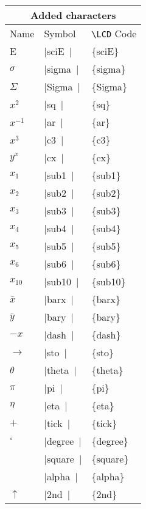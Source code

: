\documentclass[a4paper,12pt]{article}
\newcommand{\LCDsymb}[1]{\large \textLCD{1}|{#1}~|}
\newcommand{\printcmd}[1]{\texttt{\textbackslash #1}}
\begin{document}
\begin{center}
	\begin{tabular}{|l|l|>{\ttfamily}l|}
		\multicolumn{3}{c}{\textbf{Added characters}} \\
		\hline
		Name       & Symbol          &\textnormal{\printcmd{LCD} Code} \\
		\hline
		E          & \LCDsymb{sciE}  & \{sciE\} \\
		$\sigma$   & \LCDsymb{sigma} & \{sigma\} \\
        $\Sigma$   & \LCDsymb{Sigma} & \{Sigma\} \\
		$x^2$      & \LCDsymb{sq}    & \{sq\} \\
		$x^{-1}$   & \LCDsymb{ar}    & \{ar\} \\
        $x^3$      & \LCDsymb{c3}    & \{c3\} \\
		$y^x$      & \LCDsymb{cx}    & \{cx\} \\
		$x_1$      & \LCDsymb{sub1}  & \{sub1\} \\
		$x_2$      & \LCDsymb{sub2}  & \{sub2\} \\
		$x_3$      & \LCDsymb{sub3}  & \{sub3\} \\
		$x_4$      & \LCDsymb{sub4}  & \{sub4\} \\
		$x_5$      & \LCDsymb{sub5}  & \{sub5\} \\
		$x_6$      & \LCDsymb{sub6}  & \{sub6\} \\
        $x_{10}$   & \LCDsymb{sub10} & \{sub10\} \\
		$\bar x$   & \LCDsymb{barx}  & \{barx\} \\
		$\bar y$   & \LCDsymb{bary}  & \{bary\} \\
        $-x$       & \LCDsymb{dash}  & \{dash\} \\
        $\rightarrow$ & \LCDsymb{sto}& \{sto\} \\
        $\theta$   & \LCDsymb{theta} & \{theta\} \\
        $\pi$      & \LCDsymb{pi}    & \{pi\} \\
        $\eta$     & \LCDsymb{eta}   & \{eta\} \\
        $+$        & \LCDsymb{tick}   & \{tick\} \\
        $^\circ$   & \LCDsymb{degree}& \{degree\} \\
                   & \LCDsymb{square}& \{square\} \\
                   & \LCDsymb{alpha} & \{alpha\} \\
        $\uparrow$ & \LCDsymb{2nd}   & \{2nd\} \\

\end{tabular}
\end{center}
\end{document}
